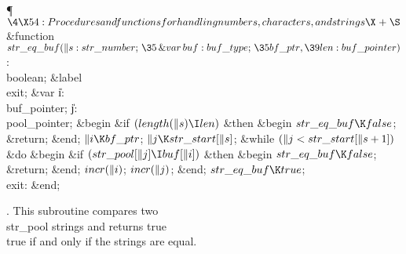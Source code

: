 \Y\P$\4\X54:Procedures and functions for handling numbers, characters, and
strings\X\mathrel{+}\S$\6
\4\&{function}\1\  $\\{str\_eq\_buf}(\|s:\\{str\_number};\,\35\mathop{%
\&{var}}\\{buf}:\\{buf\_type};\,\35\\{bf\_ptr},\39\\{len}:\\{buf\_pointer})$: %
\\{boolean};\6
\4\&{label} \\{exit};\6
\4\&{var} \|i: \\{buf\_pointer};\6
\|j: \\{pool\_pointer};\2\6
\&{begin} \&{if} $(\\{length}(\|s)\I\\{len})$ \1\&{then}\6
\&{begin} $\\{str\_eq\_buf}\K\\{false}$;\5
\&{return};\6
\&{end};\2\6
$\|i\K\\{bf\_ptr}$;\5
$\|j\K\\{str\_start}[\|s]$;\6
\&{while} $(\|j<\\{str\_start}[\|s+1])$ \1\&{do}\6
\&{begin} \&{if} $(\\{str\_pool}[\|j]\I\\{buf}[\|i])$ \1\&{then}\6
\&{begin} $\\{str\_eq\_buf}\K\\{false}$;\5
\&{return};\6
\&{end};\2\6
$\\{incr}(\|i)$;\5
$\\{incr}(\|j)$;\6
\&{end};\2\6
$\\{str\_eq\_buf}\K\\{true}$;\6
\4\\{exit}: \&{end};\par
\fi

.
This subroutine compares two \\{str\_pool} strings and returns true
\\{true} if and only if the strings are equal.

